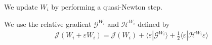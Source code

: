 We update $W_i$ by performing a quasi-Newton step. 

We use the relative gradient $\mathcal{G}^{W_i}$ and $\mathcal{H}^{W_i}$ defined
by
\begin{align}
\mathcal{J}(W_i + \varepsilon W_i) = \mathcal{J}(W_i) + \langle
 \varepsilon|\mathcal{G}^{W_i}\rangle + \frac12 \langle
 \varepsilon|\mathcal{H}^{W_i} \varepsilon \rangle
\end{align}

